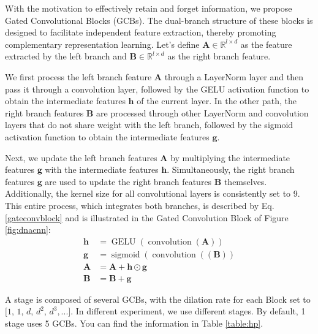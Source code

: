 With the motivation to effectively retain and forget information, we propose Gated Convolutional Blocks (GCBs). The dual-branch structure of these blocks is designed to facilitate independent feature extraction, thereby promoting complementary representation learning. Let's define $\mathbf{A} \in \mathbb{R}^{l\times d}$ as the feature extracted by the left branch and $\mathbf{B} \in \mathbb{R}^{l\times d}$ as the right branch feature.

We first process the left branch feature $\mathbf{A}$ through a LayerNorm layer and then pass it through a convolution layer, followed by the GELU activation function to obtain the intermediate features $\mathbf{h}$ of the current layer. In the other path, the right branch features $\mathbf{B}$ are processed through other LayerNorm and convolution layers that do not share weight with the left branch, followed by the sigmoid activation function to obtain the intermediate features $\mathbf{g}$.

Next, we update the left branch features $\mathbf{A}$ by multiplying the intermediate features $\mathbf{g}$ with the intermediate features $\mathbf{h}$. Simultaneously, the right branch features $\mathbf{g}$ are used to update the right branch features $\mathbf{B}$ themselves. Additionally, the kernel size for all convolutional layers is consistently set to 9. This entire process, which integrates both branches, is described by Eq.\ref{gateconvblock} and is illustrated in the Gated Convolution Block of Figure \ref{fig:dnacnn}:
\begin{equation}\label{gateconvblock}
\begin{aligned}
    \mathbf{h} &= \operatorname{GELU}(\operatorname{convolution}(\mathbf{A})) \\
    \mathbf{g} &= \operatorname{sigmoid}(\operatorname{convolution}(\operatorname(\mathbf{B})) \\
    \mathbf{A} &= \mathbf{A} + \mathbf{h} \odot \mathbf{g} \\
    \mathbf{B} &= \mathbf{B} + \mathbf{g}
\end{aligned}
\end{equation}

A stage is composed of several GCBs, with the dilation rate for each Block set to 
$[{1}$, ${1}$, ${d}$, ${d^2}$, ${d^3}, ...]$. 
%
In different experiment, we use different stages. By default, 1 stage uses 5 GCBs. You can find the information in Table \ref{table:hp}.

